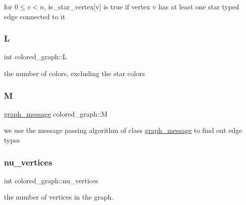 for $0 \leq v < n$, is\+\_\+star\+\_\+vertex\mbox{[}v\mbox{]} is true if vertex v has at least one star typed edge connected to it 

\mbox{\label{classcolored__graph_ae159d1b15106b70a2eabef8884501e97}} 
\subsubsection{\texorpdfstring{L}{L}}
{\footnotesize\ttfamily int colored\+\_\+graph\+::L}



the number of colors, excluding the star colors 

\mbox{\label{classcolored__graph_ab72c568fe12f7c849ca6bffb145aec47}} 
\subsubsection{\texorpdfstring{M}{M}}
{\footnotesize\ttfamily \hyperlink{classgraph__message}{graph\+\_\+message} colored\+\_\+graph\+::M}



we use the message passing algorithm of class \hyperlink{classgraph__message}{graph\+\_\+message} to find out edge types 

\mbox{\label{classcolored__graph_a90ece8eb1fec52f3f41549ab527c1d5b}} 
\subsubsection{\texorpdfstring{nu\+\_\+vertices}{nu\_vertices}}
{\footnotesize\ttfamily int colored\+\_\+graph\+::nu\+\_\+vertices}



the number of vertices in the graph. 

\mbox{\label{classcolored__graph_ab7ee8d717abde7ad7467ef695038f574}} 
